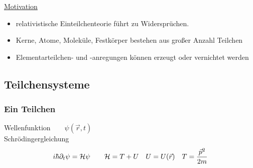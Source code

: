 
\underline{Motivation}
\begin{itemize}
\item relativistische Einteilchenteorie führt zu Widersprüchen.
\item Kerne, Atome, Moleküle, Festkörper bestehen aus großer Anzahl Teilchen
\item Elementarteilchen- und -anregungen können erzeugt oder vernichtet werden
\end{itemize}
\subsection{Teilchensysteme}
\subsubsection{Ein Teilchen}
Wellenfunktion$\qquad \psi(\vec r, t)$\\
Schrödingergleichung \begin{eqnarray*} i\hbar \partial_t \psi = \mathcal H \psi \qquad \mathcal H = T + U\quad U = U(\vec r)\quad T = \frac{\vec p^2}{2m}\end{eqnarray*}
